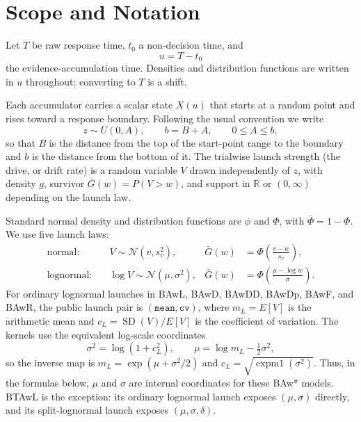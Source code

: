 \documentclass[12pt]{article}
\newcommand{\Normal}{\mathcal{N}}
\newcommand{\PhiN}{\Phi}
\newcommand{\phiN}{\phi}
\newcommand{\Phibar}{\bar{\Phi}}
\newcommand{\Gbar}{\bar{G}}
\theoremstyle{remark}
\begin{document}
\begin{abstract}
warp can be applied to each model: \(s=c_\eta(u)\), with \(\eta=0\) recovering the parent model exactly and the response density carrying the corresponding Jacobian.
\end{abstract}

\tableofcontents
\newpage

\section{Scope and Notation}
Let $T$ be raw response time, $t_0$ a non-decision time, and
\begin{equation}
  u = T - t_0
\end{equation}
the evidence-accumulation time. Densities and distribution functions are written in $u$ throughout; converting to $T$ is a shift.

Each accumulator carries a scalar state $X(u)$ that starts at a random point and rises toward a response boundary. Following the usual convention we write
\begin{equation}
  z \sim U(0,A), \qquad b = B + A, \qquad 0 \le A \le b,
\end{equation}
so that $B$ is the distance from the top of the start-point range to the boundary and $b$ is the distance from the bottom of it. The trialwise launch strength (the drive, or drift rate) is a random variable $V$ drawn independently of $z$, with density $g$, survivor $\Gbar(w) = P(V > w)$, and support in $\mathbb{R}$ or $(0,\infty)$ depending on the launch law.

Standard normal density and distribution functions are $\phiN$ and $\PhiN$, with $\Phibar = 1 - \PhiN$. We use five launch laws:
\begin{align}
  \text{normal:}\quad & V \sim \Normal(v, s_v^2),
    & \Gbar(w) &= \PhiN\!\left(\frac{v-w}{s_v}\right), \\
  \text{lognormal:}\quad & \log V \sim \Normal(\mu, \sigma^2),
    & \Gbar(w) &= \PhiN\!\left(\frac{\mu - \log w}{\sigma}\right).
\end{align}
For ordinary lognormal launches in BAwL, BAwD, BAwDD, BAwDp, BAwF, and BAwR, the public launch pair is $(\texttt{mean},\texttt{cv})$, where $m_L=E[V]$ is the arithmetic mean and $c_L=\operatorname{SD}(V)/E[V]$ is the coefficient of variation. The kernels use the equivalent log-scale coordinates
\begin{equation}
  \sigma^2 = \log(1+c_L^2),
  \qquad
  \mu = \log m_L - \tfrac12\sigma^2,
  \label{eq:lognormal-mean-cv}
\end{equation}
so the inverse map is $m_L=\exp(\mu+\sigma^2/2)$ and $c_L=\sqrt{\operatorname{expm1}(\sigma^2)}$. Thus, in the formulas below, $\mu$ and $\sigma$ are internal coordinates for these BAw* models. BTAwL is the exception: its ordinary lognormal launch exposes $(\mu,\sigma)$ directly, and its split-lognormal launch exposes $(\mu,\sigma,\delta)$.
\end{document}

